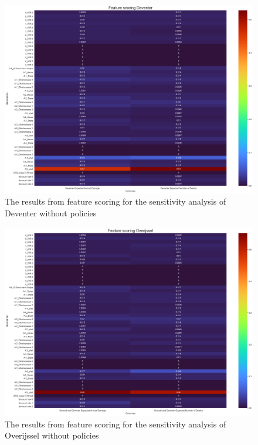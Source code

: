 \begin{figure}[h!]
    \centering
    \includegraphics[width=\textwidth]{report/figures/results/sa_model_Deventer.png}
    \caption{The results from feature scoring for the sensitivity analysis of Deventer without policies}
    \label{fig:feat-scor-d-wo}
\end{figure}

\begin{figure}[h!]
    \centering
    \includegraphics[width=\textwidth]{report/figures/results/sa_model_Overijssel.png}
    \caption{The results from feature scoring for the sensitivity analysis of Overijssel without policies}
    \label{fig:feat-scor-o-wo}
\end{figure}

